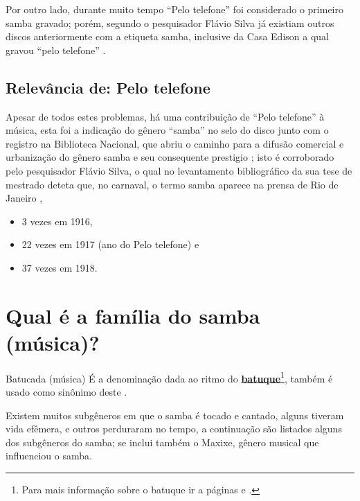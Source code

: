 Por outro lado, durante muito tempo ``Pelo telefone'' foi considerado o primeiro samba gravado;
porém, segundo o pesquisador Flávio Silva  já existiam outros discos anteriormente com a etiqueta samba,
inclusive da Casa Edison a qual gravou ``pelo telefone''  
\cite{da1975origines} \cite[pp. 96]{hertzman2013making} \cite[pp. 118]{sandroni2001feitico}.

\subsection{Relevância de: Pelo telefone}
Apesar de todos estes problemas, há uma contribuição de ``Pelo telefone'' à música, 
esta foi a indicação do gênero ``samba'' no selo do disco junto com o registro na Biblioteca Nacional,
que abriu o caminho para a difusão comercial e urbanização do gênero samba
 e seu consequente prestigio \cite{musicapelotelefone} \cite[pp. 49]{diniz2008almanaque};
isto é corroborado pelo pesquisador Flávio Silva, 
o qual no levantamento bibliográfico da sua tese de mestrado deteta que, no carnaval, 
o termo samba aparece na prensa  de Rio de Janeiro \cite{da1975origines} \cite[pp. 118]{sandroni2001feitico}, 
\begin{itemize}
\item 3 vezes em 1916, 
\item 22 vezes em 1917 (ano do Pelo telefone) e
\item 37 vezes em 1918.
\end{itemize}


\section{Qual é a família do samba (música)?}
\label{sec:FamiliaSamba}
\begin{tcbinformation}{Batucada (música)}
É a denominação dada ao ritmo do 
\hyperref[ref:batuquedanca]{\textbf{batuque}}\footnote{Para 
mais informação sobre o batuque ir a páginas \pageref{ref:batuquedanca1800} e \pageref{ref:batuquedanca}.}, 
também é usado como sinônimo deste \cite[pp. 89]{marcondes1977enciclopedia}.
\end{tcbinformation}
Existem muitos subgêneros em que o samba é tocado e cantado, alguns tiveram vida efêmera,
e outros perduraram no tempo, a continuação são listados alguns dos subgêneros do samba;
se inclui também o Maxixe, gênero musical que influenciou o samba.


